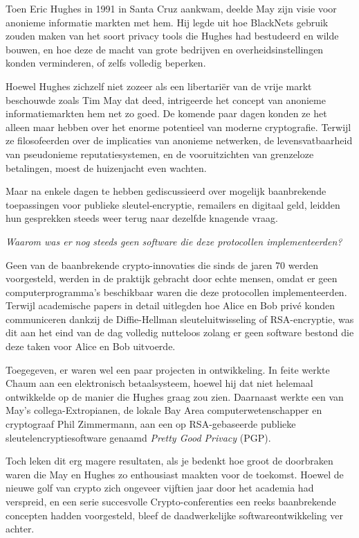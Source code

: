 \documentclass[
  a5paper,
  smalldemyvopaper,11pt,twoside,onecolumn,openright,extrafontsizes]{memoir}
\begin{document}
Toen Eric Hughes in 1991 in Santa Cruz aankwam, deelde May zijn visie
voor anonieme informatie markten met hem. Hij legde uit hoe BlackNets
gebruik zouden maken van het soort privacy tools die Hughes had
bestudeerd en wilde bouwen, en hoe deze de macht van grote bedrijven en
overheidsinstellingen konden verminderen, of zelfs volledig beperken.

Hoewel Hughes zichzelf niet zozeer als een libertariër van de vrije
markt beschouwde zoals Tim May dat deed, intrigeerde het concept van
anonieme informatiemarkten hem net zo goed. De komende paar dagen konden
ze het alleen maar hebben over het enorme potentieel van moderne
cryptografie. Terwijl ze filosofeerden over de implicaties van anonieme
netwerken, de levensvatbaarheid van pseudonieme reputatiesystemen, en de
vooruitzichten van grenzeloze betalingen, moest de huizenjacht even
wachten.

Maar na enkele dagen te hebben gediscussieerd over mogelijk baanbrekende
toepassingen voor publieke sleutel-encryptie, remailers en digitaal
geld, leidden hun gesprekken steeds weer terug naar dezelfde knagende
vraag.

\emph{Waarom was er nog steeds geen software die deze protocollen
implementeerden?}

Geen van de baanbrekende crypto-innovaties die sinds de jaren 70 werden
voorgesteld, werden in de praktijk gebracht door echte mensen, omdat er
geen computerprogramma's beschikbaar waren die deze protocollen
implementeerden. Terwijl academische papers in detail uitlegden hoe
Alice en Bob privé konden communiceren dankzij de Diffie-Hellman
sleuteluitwisseling of RSA-encryptie, was dit aan het eind van de dag
volledig nutteloos zolang er geen software bestond die deze taken voor
Alice en Bob uitvoerde.

Toegegeven, er waren wel een paar projecten in ontwikkeling. In feite
werkte Chaum aan een elektronisch betaalsysteem, hoewel hij dat niet
helemaal ontwikkelde op de manier die Hughes graag zou zien. Daarnaast
werkte een van May's collega-Extropianen, de lokale Bay Area
computerwetenschapper en cryptograaf Phil Zimmermann, aan een op
RSA-gebaseerde publieke sleutelencryptiesoftware genaamd \emph{Pretty
Good Privacy} (PGP).

Toch leken dit erg magere resultaten, als je bedenkt hoe groot de
doorbraken waren die May en Hughes zo enthousiast maakten voor de
toekomst. Hoewel de nieuwe golf van crypto zich ongeveer vijftien jaar
door het academia had verspreid, en een serie succesvolle
Crypto-conferenties een reeks baanbrekende concepten hadden voorgesteld,
bleef de daadwerkelijke softwareontwikkeling ver achter.
\end{document}

